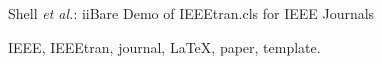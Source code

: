 \documentclass[journal]{IEEEtran}
\begin{document}
%
{Shell \MakeLowercase{\textit{et al.}}: iiBare Demo of IEEEtran.cls for IEEE Journals}
% 











\maketitle

\begin{abstract}
The abstract goes here.
\end{abstract}

\begin{IEEEkeywords}
IEEE, IEEEtran, journal, \LaTeX, paper, template.
\end{IEEEkeywords}






%
\IEEEpeerreviewmaketitle
\end{document}
